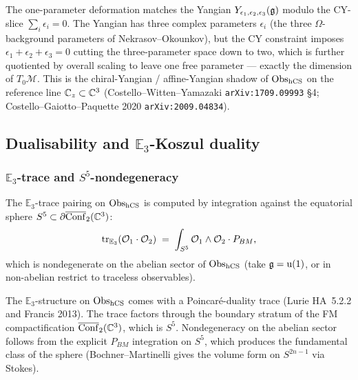 \begin{remark}\ClaimStatusRemark
\label{opus13:rem:yangian-match}
The one-parameter deformation matches the Yangian
$Y_{\epsilon_1,\epsilon_2,\epsilon_3}(\mathfrak{g})$ modulo the CY-slice
$\sum_i \epsilon_i = 0$. The Yangian has three complex parameters
$\epsilon_i$ (the three $\Omega$-background parameters of
Nekrasov--Okounkov), but the CY constraint imposes
$\epsilon_1+\epsilon_2+\epsilon_3 = 0$ cutting the three-parameter
space down to two, which is further quotiented by overall scaling to
leave one free parameter — exactly the dimension of
$T_0\mathcal{M}$. This is the chiral-Yangian / affine-Yangian shadow
of $\mathrm{Obs}_{\mathrm{hCS}}$ on the reference line $\mathbb{C}_z \subset \mathbb{C}^3$
(Costello--Witten--Yamazaki \texttt{arXiv:1709.09993} \S4;
Costello--Gaiotto--Paquette 2020 \texttt{arXiv:2009.04834}).
\end{remark}


\subsection{Dualisability and $\mathbb E_3$-Koszul duality}
\label{opus13:subsec:duality}

\subsubsection{$\mathbb E_3$-trace and $S^5$-nondegeneracy}

\begin{theorem}\ClaimStatusTheorem
\label{opus13:thm:trace-S5}
The $\mathbb E_3$-trace pairing on $\mathrm{Obs}_{\mathrm{hCS}}$ is computed by
integration against the equatorial sphere
$S^5 \subset \partial\overline{\mathrm{Conf}}_2(\mathbb{C}^3)$:
\begin{equation}
  \mathrm{tr}_{\mathbb E_3}(\mathcal{O}_1\cdot\mathcal{O}_2)
  \;=\; \int_{S^5} \mathcal{O}_1 \wedge \mathcal{O}_2\cdot P_{BM},
  \label{opus13:eq:trace-S5}
\end{equation}
which is nondegenerate on the abelian sector of $\mathrm{Obs}_{\mathrm{hCS}}$ (take
$\mathfrak{g} = \mathrm{u}(1)$, or in non-abelian restrict to traceless
observables).
\end{theorem}

\begin{proof-sketch}
The $\mathbb E_3$-structure on $\mathrm{Obs}_{\mathrm{hCS}}$ comes with a
Poincaré-duality trace (Lurie HA~5.2.2 and Francis 2013). The trace
factors through the boundary stratum of the FM compactification
$\overline{\mathrm{Conf}}_2(\mathbb{C}^3)$, which is $S^5$. Nondegeneracy on the
abelian sector follows from the explicit $P_{BM}$ integration on $S^5$,
which produces the fundamental class of the sphere (Bochner--Martinelli
gives the volume form on $S^{2n-1}$ via Stokes).
\end{proof-sketch}


